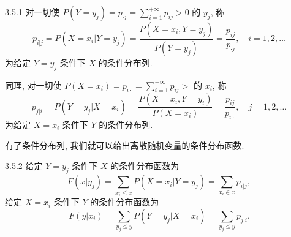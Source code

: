 	\begin{definition}{}{3.5.1}
		对一切使 $P\left(Y=y_{j}\right)=p_{ \cdot j}=\sum_{i=1}^{+\infty} p_{i j}>0$ 的 $y_j$, 称		
		\begin{equation}\label{eq:3.5.1}
			p_{i | j}=P\left(X=x_{i} | Y=y_{j}\right)=\frac{P\left(X=x_{i}, Y=y_{j}\right)}{P\left(Y=y_{j}\right)}
			=\frac{p_{i j}}{p_{\cdot j}}, \quad i=1,2, \ldots
		\end{equation}
		为给定 $Y=y_j$ 条件下 $X$ 的条件分布列.

		同理, 对一切使 $P\left(X=x_{i}\right)=p_{i\cdot} =\sum_{i=1}^{+\infty} p_{i j}>$ 的 $x_i$, 称
		\begin{equation}\label{eq:3.5.2}
		 	p_{j | i}=P\left(Y=y_{j} | X=x_{i}\right)=\frac{P\left(X=x_{i}, 
		 	Y=y_{i}\right)}{P\left(X=x_{i}\right)}=\frac{p_{i j}}{p_{i\cdot}}, \quad j=1,2, \ldots
		\end{equation}
		为给定 $X=x_i$ 条件下 $Y$ 的条件分布列.
	\end{definition}
	有了条件分布列, 我们就可以给出离散随机变量的条件分布函数.
	\begin{definition}{}{3.5.2}
		给定 $Y=y_j$ 条件下 $X$ 的条件分布函数为
		\begin{equation}\label{eq:3.5.3}
		 	F\left(x | y_{j}\right)=\sum_{x_{i} \leq x} P\left(X=x_{i} | Y=y_{j}\right)=\sum_{x_{i} \in x} p_{i | j},
		\end{equation}
		给定 $X=x_i$ 条件下 $Y$ 的条件分布函数为
		\begin{equation}\label{eq:3.5.4}
		 	F\left(y | x_{i}\right)=\sum_{y_{j} \leq  y} P\left(Y=y_{j} | X=x_{i}\right)=\sum_{y_{j} \leq  y} p_{j | i}.
		\end{equation}
	\end{definition}

